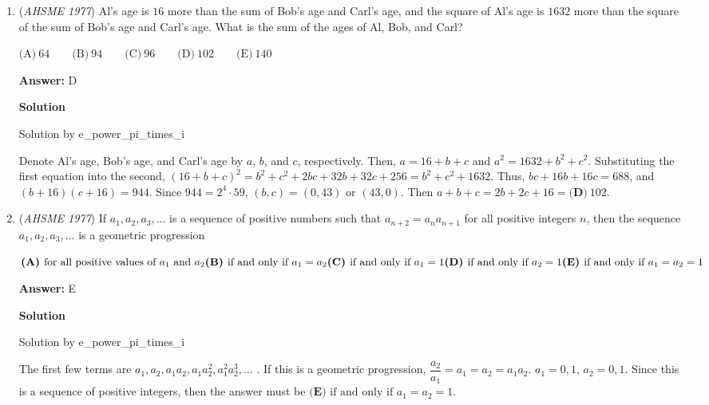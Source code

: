 \begin{enumerate}
 


	\item (\textit{AHSME 1977}) Al's age is $16$ more than the sum of Bob's age and Carl's age, and the square of Al's age is $1632$ more than the square of the sum of 
Bob's age and Carl's age. What is the sum of the ages of Al, Bob, and Carl?     


 $\text{(A)}\ 64 \qquad  \text{(B)}\ 94 \qquad  \text{(C)}\ 96 \qquad  \text{(D)}\ 102 \qquad  \text{(E)}\ 140$

 \textbf{Answer: }D



\textbf{Solution}

Solution by e\_power\_pi\_times\_i

 Denote Al's age, Bob's age, and Carl's age by $a$, $b$, and $c$, respectively. Then, $a = 16 + b + c$ and $a^2 = 1632 + b^2 + c^2$. Substituting the first equation into the second, $(16 + b + c)^2 = b^2 + c^2 + 2bc + 32b + 32c + 256 = b^2 + c^2 + 1632$. Thus, $bc + 16b + 16c = 688$, and $(b+16)(c+16) = 944$. Since $944 = 2^4\cdot59$, $(b,c) = (0,43)$ or $(43,0)$. Then $a + b + c = 2b + 2c + 16 = \boxed{\textbf{(D)}\ 102}$.

 


	\item (\textit{AHSME 1977}) If $a_1,a_2,a_3,\dots$ is a sequence of positive numbers such that $a_{n+2}=a_na_{n+1}$ for all positive integers $n$, 
then the sequence $a_1,a_2,a_3,\dots$ is a geometric progression


 $\textbf{(A) }\text{for all positive values of }a_1\text{ and }a_2\qquad\\ \textbf{(B) }\text{if and only if }a_1=a_2\qquad\\ \textbf{(C) }\text{if and only if }a_1=1\qquad\\ \textbf{(D) }\text{if and only if }a_2=1\qquad\\ \textbf{(E) }\text{if and only if }a_1=a_2=1$

 \textbf{Answer: }E



\textbf{Solution}

Solution by e\_power\_pi\_times\_i

 The first few terms are $a_1,a_2,a_1a_2,a_1a_2^2,a_1^2a_2^3,\dots$ . If this is a geometric progression, $\dfrac{a_2}{a_1} = a_1 = a_2 = a_1a_2$. $a_1=0,1$, $a_2=0,1$. Since this is a sequence of positive integers, then the answer must be $\boxed{\textbf{(E) }\text{if and only if }a_1=a_2=1 }$.


\end{enumerate}
